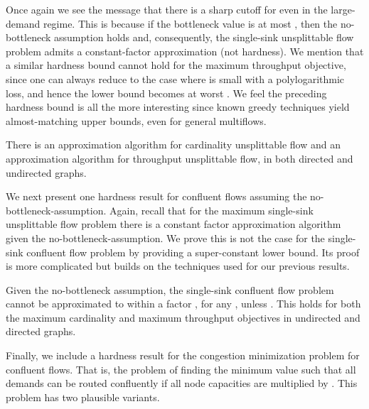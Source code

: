 \documentclass[12pt]{article}
\begin{document}
Once again we see the message that there is a sharp cutoff for   even in the
large-demand regime. This is because
 if the bottleneck value is at most , then the
no-bottleneck assumption holds and, consequently, the single-sink unsplittable flow problem
admits a constant-factor approximation (not  hardness).
We mention that a similar hardness bound cannot hold   for the maximum throughput objective, since one can
always reduce to the case where  is small with a polylogarithmic loss, and hence the lower
bound becomes at worst . We feel the preceding hardness bound is all the more
interesting since known greedy techniques
yield almost-matching  upper bounds, even for general multiflows.
\begin{thm}
\label{thm:upper}
There is an  approximation algorithm
for cardinality unsplittable flow and an  approximation algorithm
for throughput unsplittable flow, in both directed and undirected graphs.
\end{thm}


We next present one hardness result for confluent flows assuming the no-bottleneck-assumption.
Again, recall that for the maximum single-sink unsplittable flow problem
there is a constant factor approximation algorithm given the no-bottleneck-assumption.
We prove this is not the case for the single-sink confluent flow problem by providing a super-constant lower bound.
Its proof is more complicated but builds on the techniques used for our previous results.
\begin{thm}\label{thm:hardnba}
Given the no-bottleneck assumption, the single-sink confluent flow problem
cannot be approximated to within a factor , for any , unless .
This holds for both the maximum cardinality and maximum throughput objectives
in undirected and directed graphs.
\end{thm}




Finally, we include a hardness result for the congestion minimization problem for confluent flows.
That is, the problem of finding the minimum value  such that all demands can be routed confluently if all node capacities are multiplied by .
This problem has two plausible variants.
\end{document}

